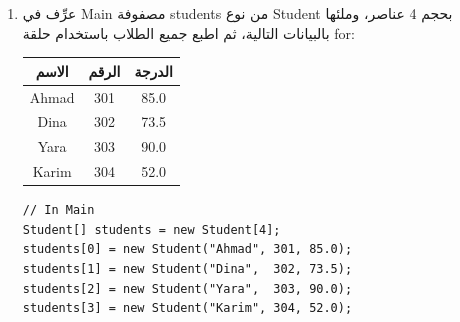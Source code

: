 \documentclass[14pt]{extarticle}
\begin{document}
\begin{enumerate}
\ifwithsols
{\small
\begin{boxSolution}
\begin{english}
\begin{verbatim}
// In Main
Student s1 = new Student("Lina", 201, 48.0);
Student s2 = new Student("Nour", 202, 62.5);

if (s1.IsPassing())
    Console.WriteLine(s1.GetName() + " is passing.");
else
    Console.WriteLine(s1.GetName() + " is failing.");

if (s2.IsPassing())
    Console.WriteLine(s2.GetName() + " is passing.");
else
    Console.WriteLine(s2.GetName() + " is failing.");
\end{verbatim}
\end{english}
\end{boxSolution}
}
\clearpage
\fi

\item %

عرِّف في \textenglish{Main} مصفوفة \textenglish{students} من نوع \textenglish{Student} بحجم 4 عناصر، وملئها بالبيانات التالية، ثم اطبع جميع الطلاب باستخدام حلقة \textenglish{for}:

\begin{center}
\begin{tabular}{|c|c|c|}
\hline
\textbf{الاسم} & \textbf{الرقم} & \textbf{الدرجة} \\
\hline
\textenglish{Ahmad} & \textenglish{301} & \textenglish{85.0} \\
\textenglish{Dina}  & \textenglish{302} & \textenglish{73.5} \\
\textenglish{Yara}  & \textenglish{303} & \textenglish{90.0} \\
\textenglish{Karim} & \textenglish{304} & \textenglish{52.0} \\
\hline
\end{tabular}
\end{center}

\ifwithsols
{\small
\begin{boxSolution}
\begin{english}
\begin{verbatim}
// In Main
Student[] students = new Student[4];
students[0] = new Student("Ahmad", 301, 85.0);
students[1] = new Student("Dina",  302, 73.5);
students[2] = new Student("Yara",  303, 90.0);
students[3] = new Student("Karim", 304, 52.0);


\end{verbatim}
\end{english}
\end{boxSolution}}
\end{enumerate}
\end{document}
